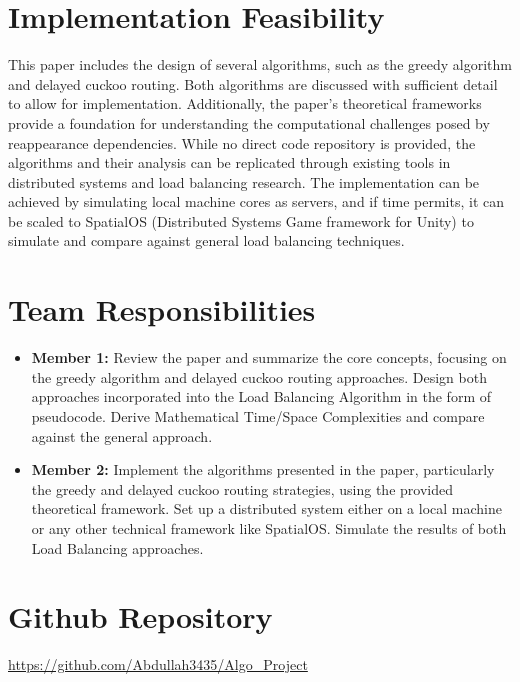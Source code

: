 \documentclass[12pt]{article}
\begin{document}
\section*{Implementation Feasibility}
This paper includes the design of several algorithms, such as the greedy algorithm and delayed cuckoo routing. Both algorithms are discussed with sufficient detail to allow for implementation. 
Additionally, the paper's theoretical frameworks provide a foundation for understanding the computational challenges posed by reappearance dependencies. While no direct code repository is provided, the 
algorithms and their analysis can be replicated through existing tools in distributed systems and load balancing research. The implementation can be achieved by simulating local machine cores as servers, and if time 
permits, it can be scaled to SpatialOS (Distributed Systems Game framework for Unity) to simulate and compare against general load balancing techniques.

\section*{Team Responsibilities}
\begin{itemize}
    \item \textbf{Member 1:} Review the paper and summarize the core concepts, focusing on the greedy algorithm and delayed cuckoo routing approaches. Design both approaches incorporated into the Load Balancing Algorithm in the form of pseudocode. Derive Mathematical Time/Space Complexities and compare against the general approach.
    \item \textbf{Member 2:} Implement the algorithms presented in the paper, particularly the greedy and delayed cuckoo routing strategies, using the provided theoretical framework. Set up a distributed system either on a local machine or any other technical framework like SpatialOS. Simulate the results of both Load Balancing approaches.
\end{itemize}

\section*{Github Repository}
\url{https://github.com/Abdullah3435/Algo_Project}
\end{document}
